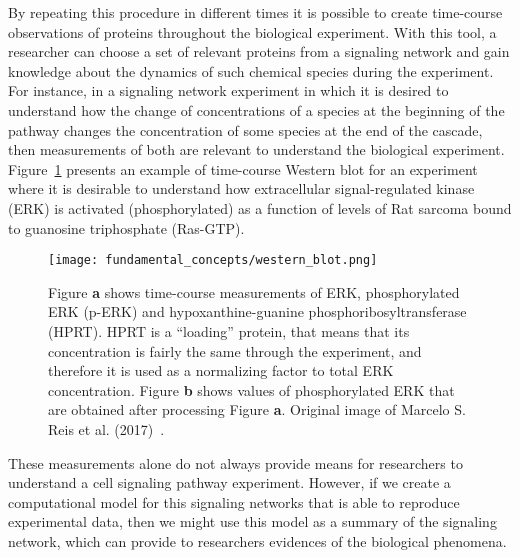 By repeating this procedure in different times it is possible to create 
time-course observations of proteins throughout the biological 
experiment. With this tool, a researcher can choose a set of relevant 
proteins from a signaling network and gain knowledge about the dynamics 
of such chemical species during the experiment. For instance, in a 
signaling network experiment in which it is desired to understand how
the change of concentrations of a species at the beginning of the 
pathway changes the concentration of some species at the end of the 
cascade, then measurements of both are relevant to understand the 
biological experiment. Figure~\ref{fig:western_blot_example} presents an 
example of time-course Western blot for an experiment where it is 
desirable to understand how extracellular signal-regulated kinase (ERK)
is activated (phosphorylated) as a function of levels of Rat sarcoma
bound to guanosine triphosphate (Ras-GTP).

\begin{figure}[!ht]
\centering
    \texttt{[image: fundamental\_concepts/western\_blot.png]}
    \caption{Figure {\bf a} shows time-course measurements of ERK, 
    phosphorylated ERK (p-ERK) and hypoxanthine-guanine 
    phosphoribosyltransferase (HPRT). HPRT is a ``loading'' protein, 
    that means that its concentration is fairly the same through the 
    experiment, and therefore it is used as a normalizing factor to 
    total ERK concentration. Figure  {\bf b} shows values of 
    phosphorylated ERK that are obtained after processing Figure 
    {\bf a}. Original image of Marcelo S. Reis et al. 
    (2017)~\cite{Reis2017}.}
    \label{fig:western_blot_example}
\end{figure}

These measurements alone do not always provide means for researchers to 
understand a cell signaling pathway experiment. However, if we create a 
computational model for this signaling networks that is able to 
reproduce experimental data, then we might use this model as a 
summary of the signaling network, which can provide to researchers 
evidences of the biological phenomena.


